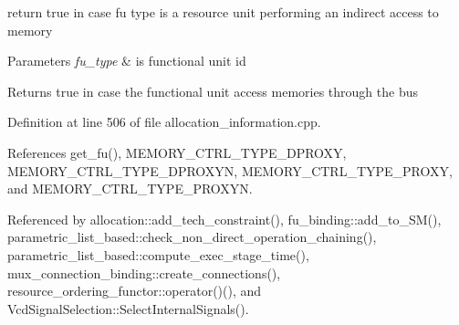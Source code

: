return true in case fu type is a resource unit performing an indirect access to memory 


\begin{DoxyParams}{Parameters}
{\em fu\+\_\+type} & is functional unit id \\
\hline
\end{DoxyParams}
\begin{DoxyReturn}{Returns}
true in case the functional unit access memories through the bus 
\end{DoxyReturn}


Definition at line 506 of file allocation\+\_\+information.\+cpp.



References get\+\_\+fu(), M\+E\+M\+O\+R\+Y\+\_\+\+C\+T\+R\+L\+\_\+\+T\+Y\+P\+E\+\_\+\+D\+P\+R\+O\+XY, M\+E\+M\+O\+R\+Y\+\_\+\+C\+T\+R\+L\+\_\+\+T\+Y\+P\+E\+\_\+\+D\+P\+R\+O\+X\+YN, M\+E\+M\+O\+R\+Y\+\_\+\+C\+T\+R\+L\+\_\+\+T\+Y\+P\+E\+\_\+\+P\+R\+O\+XY, and M\+E\+M\+O\+R\+Y\+\_\+\+C\+T\+R\+L\+\_\+\+T\+Y\+P\+E\+\_\+\+P\+R\+O\+X\+YN.



Referenced by allocation\+::add\+\_\+tech\+\_\+constraint(), fu\+\_\+binding\+::add\+\_\+to\+\_\+\+S\+M(), parametric\+\_\+list\+\_\+based\+::check\+\_\+non\+\_\+direct\+\_\+operation\+\_\+chaining(), parametric\+\_\+list\+\_\+based\+::compute\+\_\+exec\+\_\+stage\+\_\+time(), mux\+\_\+connection\+\_\+binding\+::create\+\_\+connections(), resource\+\_\+ordering\+\_\+functor\+::operator()(), and Vcd\+Signal\+Selection\+::\+Select\+Internal\+Signals().

